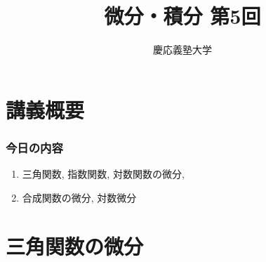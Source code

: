 \documentclass[dvipdfmx,cjk,10.2pt]{beamer}
\theoremstyle{definition}
\begin{document}
\title{微分・積分 第5回} 
\author{慶応義塾大学}            %
\date{}



\begin{frame}                  %
\titlepage                     %
\end{frame}








\section{講義概要}


\begin{frame}
\frametitle{今日の内容}



\begin{enumerate}
\item 三角関数, 指数関数, 対数関数の微分,
\item 合成関数の微分, 対数微分
\end{enumerate} 



\end{frame}






\section{三角関数の微分}
\end{document}
